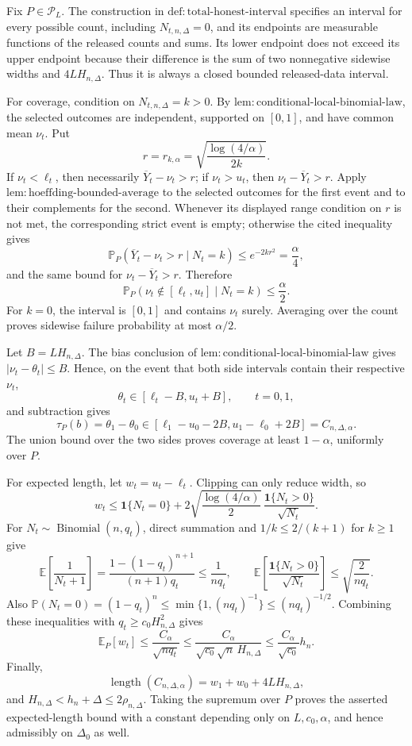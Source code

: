 Fix \(P\in\mathcal P_L\).  The construction in \(\mathrm{def:total\text{-}honest\text{-}interval}\) specifies an interval for every possible count, including \(N_{t,n,\Delta}=0\), and its endpoints are measurable functions of the released counts and sums.  Its lower endpoint does not exceed its upper endpoint because their difference is the sum of two nonnegative sidewise widths and \(4LH_{n,\Delta}\).  Thus it is always a closed bounded released-data interval.

For coverage, condition on \(N_{t,n,\Delta}=k>0\).  By \(\mathrm{lem:conditional\text{-}local\text{-}binomial\text{-}law}\), the selected outcomes are independent, supported on \([0,1]\), and have common mean \(\nu_t\).  Put
\[
 r=r_{k,\alpha}=\sqrt{\frac{\log(4/\alpha)}{2k}}.
\]
If \(\nu_t<\ell_t\), then necessarily \(\overline Y_t-\nu_t>r\); if \(\nu_t>u_t\), then \(\nu_t-\overline Y_t>r\).  Apply \(\mathrm{lem:hoeffding\text{-}bounded\text{-}average}\) to the selected outcomes for the first event and to their complements for the second.  Whenever its displayed range condition on \(r\) is not met, the corresponding strict event is empty; otherwise the cited inequality gives
\[
 \mathbb P_P(\overline Y_t-\nu_t>r\mid N_t=k)\le e^{-2kr^2}=\frac\alpha4,
\]
and the same bound for \(\nu_t-\overline Y_t>r\).  Therefore
\[
 \mathbb P_P(\nu_t\notin[\ell_t,u_t]\mid N_t=k)\le\frac\alpha2.
\]
For \(k=0\), the interval is \([0,1]\) and contains \(\nu_t\) surely.  Averaging over the count proves sidewise failure probability at most \(\alpha/2\).

Let \(B=LH_{n,\Delta}\).  The bias conclusion of \(\mathrm{lem:conditional\text{-}local\text{-}binomial\text{-}law}\) gives \(|\nu_t-\theta_t|\le B\).  Hence, on the event that both side intervals contain their respective \(\nu_t\),
\[
 \theta_t\in[\ell_t-B,u_t+B],\qquad t=0,1,
\]
and subtraction gives
\[
 \tau_P(b)=\theta_1-\theta_0
 \in[\ell_1-u_0-2B,u_1-\ell_0+2B]
 =C_{n,\Delta,\alpha}.
\]
The union bound over the two sides proves coverage at least \(1-\alpha\), uniformly over \(P\).

For expected length, let \(w_t=u_t-\ell_t\).  Clipping can only reduce width, so
\[
 w_t\le\mathbf1\{N_t=0\}
 +2\sqrt{\frac{\log(4/\alpha)}2}\,
   \frac{\mathbf1\{N_t>0\}}{\sqrt{N_t}}.
\]
For \(N_t\sim\operatorname{Binomial}(n,q_t)\), direct summation and \(1/k\le2/(k+1)\) for \(k\ge1\) give
\[
 \mathbb E\!\left[\frac1{N_t+1}\right]
 =\frac{1-(1-q_t)^{n+1}}{(n+1)q_t}
 \le\frac1{nq_t},
 \qquad
 \mathbb E\!\left[\frac{\mathbf1\{N_t>0\}}{\sqrt{N_t}}\right]
 \le\sqrt{\frac2{nq_t}}.
\]
Also \(\mathbb P(N_t=0)=(1-q_t)^n\le\min\{1,(nq_t)^{-1}\}\le(nq_t)^{-1/2}\).  Combining these inequalities with \(q_t\ge c_0H_{n,\Delta}^2\) gives
\[
 \mathbb E_P[w_t]
 \le \frac{C_\alpha}{\sqrt{nq_t}}
 \le\frac{C_\alpha}{\sqrt{c_0}\sqrt n\,H_{n,\Delta}}
 \le\frac{C_\alpha}{\sqrt{c_0}}h_n.
\]
Finally,
\[
 \operatorname{length}(C_{n,\Delta,\alpha})=w_1+w_0+4LH_{n,\Delta},
\]
and \(H_{n,\Delta}<h_n+\Delta\le2\rho_{n,\Delta}\).  Taking the supremum over \(P\) proves the asserted expected-length bound with a constant depending only on \(L,c_0,\alpha\), and hence admissibly on \(\Delta_0\) as well.